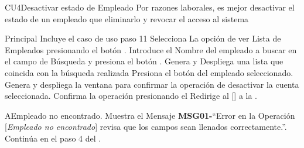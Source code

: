 \begin{UseCase}{CU4}{Desactivar estado de  Empleado}{
		Por razones laborales, es mejor desactivar el estado de un empleado que eliminarlo y revocar el acceso al sistema
	}
	\end{UseCase}
	\begin{UCtrayectoria}{Principal}
		\UCpaso Incluye el caso de uso  paso 11
		\UCpaso[\UCactor] Selecciona La opción de ver Lista de  Empleados presionando el botón .
		\UCpaso[\UCactor] Introduce el Nombre del empleado a buscar en el campo de Búsqueda y presiona el botón   .
		\UCpaso Genera y Despliega una lista que coincida con la búsqueda realizada
		\UCpaso[\UCactor] Presiona el botón del empleado seleccionado.
		\UCpaso Genera y despliega la ventana  para confirmar la operación de desactivar la cuenta seleccionada.
		\UCpaso [\UCactor] Confirma la operación presionando el 
		\UCpaso Redirige al [\UCactor] a la  .
	\end{UCtrayectoria}




\begin{UCtrayectoriaA}{A}{Empleado no encontrado.}
			\UCpaso Muestra el Mensaje {\bf MSG01-}``Error en la Operación [{\em Empleado no encontrado}] revisa que los campos sean llenados correctamente.''.
			\UCpaso Continúa en el paso 4 del .
		\end{UCtrayectoriaA}

